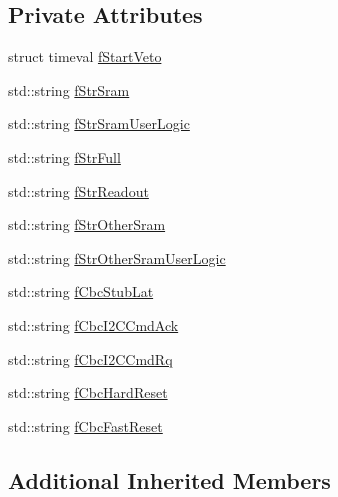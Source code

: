\subsection*{Private Attributes}
\begin{DoxyCompactItemize}
\item 
struct timeval \hyperlink{class_ph2___hw_interface_1_1_glib_f_w_interface_a211b2606feb8fad3ac74f00b2d089ade}{f\-Start\-Veto}
\item 
std\-::string \hyperlink{class_ph2___hw_interface_1_1_glib_f_w_interface_a3fd05ec282e3485d13f3d4271f622039}{f\-Str\-Sram}
\item 
std\-::string \hyperlink{class_ph2___hw_interface_1_1_glib_f_w_interface_aee5e3a859a56e2ab7cead5100714851c}{f\-Str\-Sram\-User\-Logic}
\item 
std\-::string \hyperlink{class_ph2___hw_interface_1_1_glib_f_w_interface_a2d5e62e2689d9a0b0ac542ea1ea49b2c}{f\-Str\-Full}
\item 
std\-::string \hyperlink{class_ph2___hw_interface_1_1_glib_f_w_interface_a1c2f018359fc0fc7f9652d6058ac94f1}{f\-Str\-Readout}
\item 
std\-::string \hyperlink{class_ph2___hw_interface_1_1_glib_f_w_interface_a1f3b7bdef0d23e16f014a56aea92209c}{f\-Str\-Other\-Sram}
\item 
std\-::string \hyperlink{class_ph2___hw_interface_1_1_glib_f_w_interface_a875ddab3eef88b4c9b829c1b4bb03d3f}{f\-Str\-Other\-Sram\-User\-Logic}
\item 
std\-::string \hyperlink{class_ph2___hw_interface_1_1_glib_f_w_interface_a96e1ee562be7a0430ec976df840b8b3d}{f\-Cbc\-Stub\-Lat}
\item 
std\-::string \hyperlink{class_ph2___hw_interface_1_1_glib_f_w_interface_aa2c87823ad0d9c2da49526eeef10c8e6}{f\-Cbc\-I2\-C\-Cmd\-Ack}
\item 
std\-::string \hyperlink{class_ph2___hw_interface_1_1_glib_f_w_interface_aa46f35b8ba4a764c83a8cfc1ddf15f1e}{f\-Cbc\-I2\-C\-Cmd\-Rq}
\item 
std\-::string \hyperlink{class_ph2___hw_interface_1_1_glib_f_w_interface_ac7410b226fffc5a361386f6e6c3b96e0}{f\-Cbc\-Hard\-Reset}
\item 
std\-::string \hyperlink{class_ph2___hw_interface_1_1_glib_f_w_interface_a16633bf7e8c4d61cacd8a6862673221c}{f\-Cbc\-Fast\-Reset}
\end{DoxyCompactItemize}
\subsection*{Additional Inherited Members}


